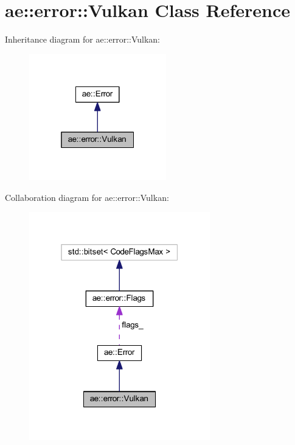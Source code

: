 \hypertarget{classae_1_1error_1_1_vulkan}{}\section{ae\+:\+:error\+:\+:Vulkan Class Reference}
\label{classae_1_1error_1_1_vulkan}


Inheritance diagram for ae\+:\+:error\+:\+:Vulkan\+:\nopagebreak
\begin{figure}[H]
\begin{center}
\leavevmode
\includegraphics[width=169pt]{classae_1_1error_1_1_vulkan__inherit__graph}
\end{center}
\end{figure}


Collaboration diagram for ae\+:\+:error\+:\+:Vulkan\+:\nopagebreak
\begin{figure}[H]
\begin{center}
\leavevmode
\includegraphics[width=223pt]{classae_1_1error_1_1_vulkan__coll__graph}
\end{center}
\end{figure}
